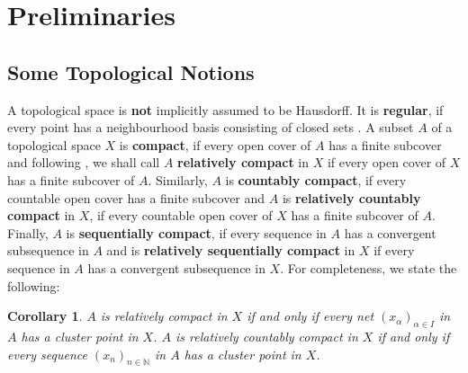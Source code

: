 \documentclass[
	paper=A4,
	pagesize=auto,
	fontsize=12pt
]{scrartcl}
\theoremstyle{plain}
\newtheorem{corollary}[theorem]{Corollary}
\theoremstyle{remark}
\theoremstyle{definition}
\begin{document}
\section{Preliminaries}
\label{sec:Preliminaries}
%
\subsection{Some Topological Notions}
%
A topological space is \textbf{not} implicitly assumed to be Hausdorff.
It is \textbf{regular}, if every point has a neighbourhood basis consisting of closed sets \cite[Example 15.33.c]{src:Schlechter:HandbookOfAnalysis}.
A subset $A$ of a topological space $X$ is \textbf{compact}, if every open cover of $A$ has a finite subcover and following \cite{src:KönigKuhn:AngelicSpaces}, we shall call $A$ \textbf{relatively compact} in $X$ if every open cover of $X$ has a finite subcover of $A$.
Similarly, $A$ is \textbf{countably compact}, if every countable open cover has a finite subcover and $A$ is \textbf{relatively countably compact} in $X$, if every countable open cover of $X$ has a finite subcover of $A$.
Finally, $A$ is \textbf{sequentially compact}, if every sequence in $A$ has a convergent subsequence in $A$ and is \textbf{relatively sequentially compact} in $X$ if every sequence in $A$ has a convergent subsequence in $X$.
For completeness, we state the following:
%
\begin{corollary}
$A$ is relatively compact in $X$ if and only if every net $(x_\alpha)_{\alpha \in I}$ in $A$ has a cluster point in $X$.
$A$ is relatively countably compact in $X$ if and only if every sequence $(x_n)_{n \in \mathbb{N}}$ in $A$ has a cluster point in $X$.
\end{corollary}
%
%
\end{document}
